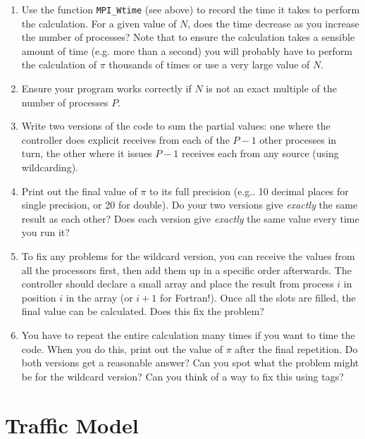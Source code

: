 \documentclass{article}
\begin{document}
\begin{enumerate}

\item Use the function {\tt MPI\_Wtime} (see above) to record the time it
takes to perform the calculation. For a given value of $N$, does the
time decrease as you increase the number of processes? Note that to
ensure the calculation takes a sensible amount of time (e.g. more
than a second) you will probably have to perform the calculation of
$\pi$ thousands of times or use a very large value of $N$.

\item Ensure your program works correctly if $N$ is not an exact
multiple of the number of processes $P$.

\item Write two versions of the code to sum the partial values: one
where the controller does explicit receives from each of the $P-1$ other
processes in turn, the other where it issues $P-1$ receives each from
any source (using wildcarding).

\item Print out the final value of $\pi$ to its full precision (e.g.. 10
decimal places for single precision, or 20 for double). Do your two
versions give {\em exactly} the same result as each other? Does each
version give {\em exactly} the same value every time you run it?

\item To fix any problems for the wildcard version, you can receive the
values from all the processors first, then add them up in a specific
order afterwards. The controller should declare a small array and place the
result from process $i$ in position $i$ in the array (or $i+1$ for
Fortran!). Once all the slots are filled, the final value can be
calculated. Does this fix the problem?

\item You have to repeat the entire calculation many times if you want
to time the code. When you do this, print out the value of $\pi$ after
the final repetition. Do both versions get a reasonable answer? Can you
spot what the problem might be for the wildcard version? Can you think
of a way to fix this using tags?

\end{enumerate}

\section{Traffic Model}
\end{document}
